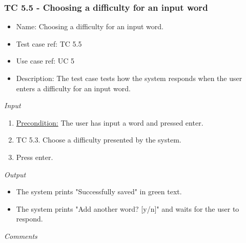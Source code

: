 \documentclass[12pt, letterpaper]{article}
\begin{document}
\subsubsection{TC 5.5 - Choosing a difficulty for an input word}
\begin{itemize}
	\item Name: Choosing a difficulty for an input word.
	\item Test case ref: TC 5.5
	\item Use case ref: UC 5
	\item Description: The test case tests how the system responds when the user enters a difficulty for an input word.
\end{itemize}
\emph{Input}
\begin{enumerate}
	\item \underline{Precondition:} The user has input a word and pressed enter.
	\item TC 5.3. Choose a difficulty presented by the system.
	\item Press enter.
\end{enumerate}
\emph{Output}
\begin{itemize}
	\item The system prints "Successfully saved" in green text.
	\item The system prints "Add another word? [y/n]" and waits for the user to respond.
\end{itemize}
\begin{Form}
\newline
{}
\newline
\end{Form}
\newline
\emph{Comments}
\newline
\newline
\newline
\newline
\newline
\newline
\newline
\end{document}
